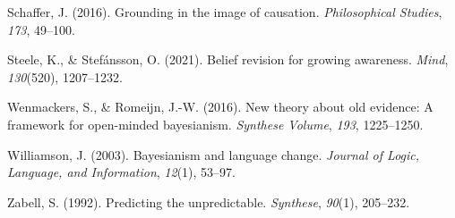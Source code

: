 \documentclass[
  11pt,
  dvipsnames,enabledeprecatedfontcommands, todos]{scrartcl}
\newlength{\cslhangindent}
\newlength{\cslentryspacingunit} %
\newenvironment{CSLReferences}[2] %
 {%
  \setlength{\parindent}{0pt}
  \ifodd #1
  \let\oldpar\par
  \def\par{\hangindent=\cslhangindent\oldpar}
  \fi
  \setlength{\parskip}{#2\cslentryspacingunit}
 }%
 {}
\begin{document}
\begin{CSLReferences}{1}{0}
\leavevmode{}%
Schaffer, J. (2016). Grounding in the image of causation.
\emph{Philosophical Studies}, \emph{173}, 49--100.

\leavevmode{}%
Steele, K., \& Stefánsson, O. (2021). Belief revision for growing
awareness. \emph{Mind}, \emph{130}(520), 1207--1232.

\leavevmode{}%
Wenmackers, S., \& Romeijn, J.-W. (2016). New theory about old evidence:
A framework for open-minded bayesianism. \emph{Synthese Volume},
\emph{193}, 1225--1250.

\leavevmode{}%
Williamson, J. (2003). Bayesianism and language change. \emph{Journal of
Logic, Language, and Information}, \emph{12}(1), 53--97.

\leavevmode{}%
Zabell, S. (1992). Predicting the unpredictable. \emph{Synthese},
\emph{90}(1), 205--232.

\end{CSLReferences}
\end{document}
